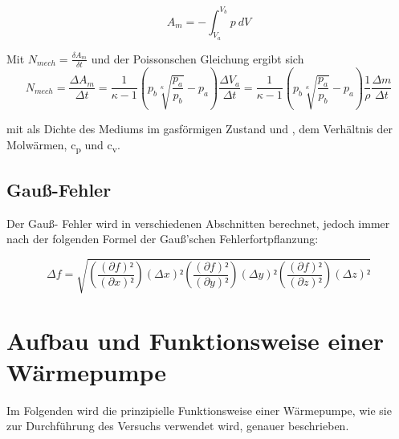 \documentclass[titlepage=firstcover, captions=tableheading]{scrartcl}
\begin{document}
\begin{displaymath}
    A_m = -\int_{V_a}^{V_b} p \: dV
\end{displaymath} 

\noindent Mit $ N_{mech} = \frac{\delta A_m}{\delta t} $ und der Poissonschen Gleichung ergibt sich
\begin{equation} \label{kompressorleistung}
    N_{mech} =\frac{\Delta A_m}{\Delta t} 
    = \frac{1}{\kappa -1} \left(p_b\sqrt[\kappa]{\frac{p_a}{p_b}}-p_a\right) \frac{\Delta V_a}{\Delta t}
    = \frac{1}{\kappa -1} \left(p_b\sqrt[\kappa]{\frac{p_a}{p_b}}-p_a\right) \frac{1}{\rho} \frac{\Delta m}{\Delta t}
\end{equation}

mit \rho \: als Dichte des Mediums im gasförmigen Zustand und \kappa , dem Verhältnis der Molwärmen, c\textsubscript{p} und c\textsubscript{v}.

\subsection{Gauß-Fehler}

Der Gauß- Fehler wird in verschiedenen Abschnitten berechnet, jedoch immer nach der folgenden Formel der Gauß'schen Fehlerfortpflanzung:

\begin{equation} \label{4}
    \Delta f = \sqrt{\left(\frac{(\partial f)²}{(\partial x)²}\right) (\Delta x)²
                     \left(\frac{(\partial f)²}{(\partial y)²}\right) (\Delta y)²
                     \left(\frac{(\partial f)²}{(\partial z)²}\right) (\Delta z)²
    }
\end{equation}

\section{Aufbau und Funktionsweise einer Wärmepumpe}

Im Folgenden wird die prinzipielle Funktionsweise einer Wärmepumpe, wie sie zur Durchführung des Versuchs verwendet wird, genauer beschrieben. 
\end{document}
